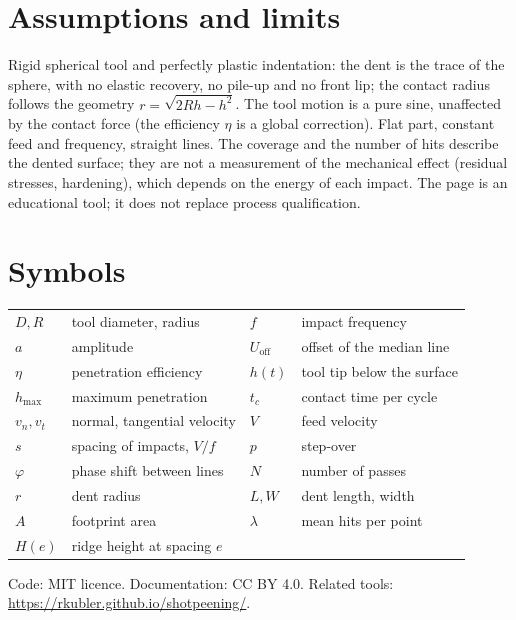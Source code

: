 \documentclass[11pt,a4paper]{article}
\begin{document}
\section{Assumptions and limits}

Rigid spherical tool and perfectly plastic indentation: the dent is the trace of the sphere, with no elastic recovery, no pile-up and no front lip; the contact radius follows the geometry $r=\sqrt{2Rh-h^2}$. The tool motion is a pure sine, unaffected by the contact force (the efficiency $\eta$ is a global correction). Flat part, constant feed and frequency, straight lines. The coverage and the number of hits describe the dented surface; they are not a measurement of the mechanical effect (residual stresses, hardening), which depends on the energy of each impact. The page is an educational tool; it does not replace process qualification.

\appendix
\section{Symbols}
\begin{tabular}{@{}ll@{\qquad}ll@{}}
$D,R$ & tool diameter, radius & $f$ & impact frequency\\
$a$ & amplitude & $U_\mathrm{off}$ & offset of the median line\\
$\eta$ & penetration efficiency & $h(t)$ & tool tip below the surface\\
$h_\mathrm{max}$ & maximum penetration & $t_c$ & contact time per cycle\\
$v_n,v_t$ & normal, tangential velocity & $V$ & feed velocity\\
$s$ & spacing of impacts, $V/f$ & $p$ & step-over\\
$\varphi$ & phase shift between lines & $N$ & number of passes\\
$r$ & dent radius & $L,W$ & dent length, width\\
$A$ & footprint area & $\lambda$ & mean hits per point\\
$H(e)$ & ridge height at spacing $e$ & & \\
\end{tabular}

\vfill
\noindent\small Code: MIT licence. Documentation: CC BY 4.0. Related tools: \url{https://rkubler.github.io/shotpeening/}.
\end{document}
